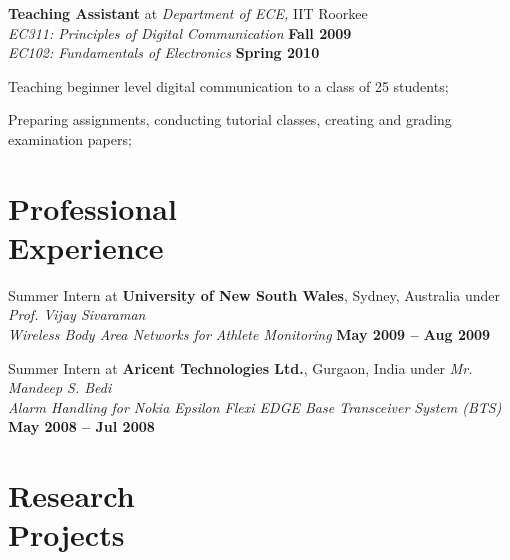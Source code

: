 \documentclass[margin,line]{resume}
\begin{document}
\begin{resume}
    \textbf{Teaching Assistant}  at \emph{Department of ECE,} IIT Roorkee		\\
    \emph{EC311: Principles of Digital Communication}		\hfill \textbf{Fall 2009}\\
    \emph{EC102: Fundamentals of Electronics} 			\hfill \textbf{Spring 2010}\\\vspace{-4mm}
    \begin{list2}
    \item Teaching beginner level digital communication to a class of 25 students;
    \item Preparing assignments, conducting tutorial classes, creating and grading examination papers;
    \end{list2}

    \section{\mysidestyle \normalsize Professional\\Experience}
 	\begin{list2}
     \item Summer Intern at \textbf{University of New South Wales}, Sydney, Australia under  \emph{Prof. Vijay Sivaraman} \\
    \emph{Wireless Body Area Networks for Athlete Monitoring} \hfill\textbf{May 2009 -- Aug 2009}\\\vspace{-4mm}
    \item Summer Intern at \textbf{Aricent Technologies Ltd.}, Gurgaon, India under \emph{Mr. Mandeep S. Bedi} \\
    \emph{Alarm Handling for Nokia Epsilon Flexi EDGE Base Transceiver System (BTS)} \hfill \textbf{May 2008 -- Jul 2008}\\
  	\end{list2}
  	
    \section{\mysidestyle \normalsize Research\\Projects}
    

\end{resume}
\end{document}

